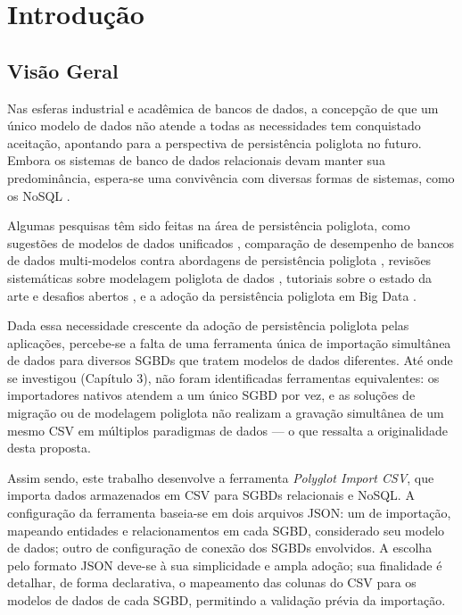 \chapter{Introdução}
\label{cap:introducao}

\section{Visão Geral}

Nas esferas industrial e acadêmica de bancos de dados, a concepção de que um único modelo
de dados não atende a todas as necessidades tem conquistado aceitação, apontando para a
perspectiva de persistência poliglota no futuro. Embora os sistemas de banco de dados
relacionais devam manter sua predominância, espera-se uma convivência com diversas formas
de sistemas, como os NoSQL \cite{sadalage2013nosql}.

Algumas pesquisas têm sido feitas na área de persistência poliglota, como sugestões de
modelos de dados unificados \cite{chillon2023propagating}, comparação de desempenho de
bancos de dados multi-modelos contra abordagens de persistência poliglota
\cite{ye2023benchmark}, revisões sistemáticas sobre modelagem poliglota de dados
\cite{silva2024modelagem}, tutoriais sobre o estado da arte e desafios abertos
\cite{kiehn2022polyglot}, e a adoção da persistência poliglota em Big Data
\cite{khine2019review}.

Dada essa necessidade crescente da adoção de persistência poliglota pelas aplicações,
percebe-se a falta de uma ferramenta única de importação simultânea de dados para diversos
SGBDs que tratem modelos de dados diferentes. Até onde se investigou (Capítulo 3), não
foram identificadas ferramentas equivalentes: os importadores nativos atendem a um único
SGBD por vez, e as soluções de migração ou de modelagem poliglota não realizam a
gravação simultânea de um mesmo CSV em múltiplos paradigmas de dados --- o que
ressalta a originalidade desta proposta.

Assim sendo, este trabalho desenvolve a ferramenta \textit{Polyglot Import
CSV}, que importa dados armazenados em CSV para SGBDs relacionais e NoSQL. A configuração
da ferramenta baseia-se em dois arquivos JSON: um de importação, mapeando entidades e
relacionamentos em cada SGBD, considerado seu modelo de dados; outro de configuração de
conexão dos SGBDs envolvidos. A escolha pelo formato JSON deve-se à sua simplicidade e
ampla adoção; sua finalidade é detalhar, de forma declarativa, o mapeamento das colunas do
CSV para os modelos de dados de cada SGBD, permitindo a validação prévia da importação.


